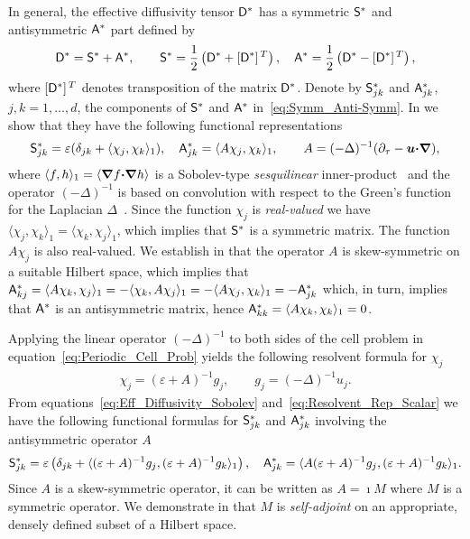 \documentclass[amsa]{ipart}
\begin{document}
In general, the effective diffusivity tensor $\mathsf{D}^*$ has a symmetric
$\mathsf{S}^*$ and antisymmetric $\mathsf{A}^*$ part defined by 
%
\begin{align}\label{eq:Symm_Anti-Symm}
  \Dm^*=\Sm^*+\Am^*,\qquad
  \Sm^*=\frac{1}{2}\left(\Dm^*+[\Dm^*]^{\,T}\right), \quad
  \Am^*=\frac{1}{2}\left(\Dm^*-[\Dm^*]^{\,T}\right),
\end{align}
%
where $[\mathsf{D}^*]^{\,T}$ denotes transposition of the matrix
$\mathsf{D}^*$. Denote by $\mathsf{S}^*_{jk}$ and $\mathsf{A}^*_{jk}$, $j,k=1,\ldots,d$, the
components of $\mathsf{S}^*$ and $\mathsf{A}^*$ in~\eqref{eq:Symm_Anti-Symm}. In
 we show that they have the following
functional representations~\cite{Pavliotis:PHD_Thesis} 
%
\begin{align}\label{eq:Eff_Diffusivity_Sobolev}
  \Sm^*_{jk}=\varepsilon(\delta_{jk}+\langle\chi_j,\chi_k\rangle_1),
  \quad
  \Am^*_{jk}=\langle A\chi_j,\chi_k\rangle_1,
  \qquad
  A=(-\Delta)^{-1}(\partial_\tau-\vecu \bcdot\bnabla),
\end{align}
%
where $\langle f,h\rangle_1=\langle\mbox{\boldmath${\nabla}$} f\mbox{\boldmath${\cdot}$}\mbox{\boldmath${\nabla}$} h\rangle$ is a Sobolev-type
\emph{sesquilinear} inner-product~\cite{McOwen:2003:PDE} and the
operator $(-\Delta)^{-1}$ is based on convolution with respect to the
Green's function for the Laplacian $\Delta$~\cite{Stakgold:BVP:2000}.  
Since the function $\chi_j$ is
\emph{real-valued} we have $\langle\chi_j,\chi_k\rangle_1=\langle\chi_k,\chi_j\rangle_1$, which implies that
$\mathsf{S}^*$ is a symmetric matrix. The function $A\chi_j$ is also
real-valued. We establish in  that the
operator $A$ is skew-symmetric on a suitable Hilbert space, which
implies that
$\mathsf{A}^*_{kj}=\langle A\chi_k,\chi_j\rangle_1=-\langle\chi_k,A\chi_j\rangle_1=-\langle A\chi_j,\chi_k\rangle_1=-\mathsf{A}^*_{jk}$
which, in turn, implies that $\mathsf{A}^*$ is an antisymmetric matrix, hence
$\mathsf{A}^*_{kk}=\langle A\chi_k,\chi_k\rangle_1=0$.  



Applying the linear operator $(-\Delta)^{-1}$ to both sides of the cell
problem in equation~\eqref{eq:Periodic_Cell_Prob} yields the following
resolvent formula for $\chi_j$
%
\begin{align}\label{eq:Resolvent_Rep_Scalar}
  \chi_j=(\varepsilon+A)^{-1}g_j, \qquad 
  g_j=(-\Delta)^{-1}u_j.
\end{align}
%
From equations~\eqref{eq:Eff_Diffusivity_Sobolev}
and~\eqref{eq:Resolvent_Rep_Scalar} we have the following functional
formulas for $\mathsf{S}^*_{jk}$ and $\mathsf{A}^*_{jk}$ involving the
antisymmetric operator $A$
%
\begin{align}\label{eq:Eff_Diff_Resolvent_Sobolev}
 \Sm^*_{jk}=\varepsilon\left(\delta_{jk}
  +\langle(\varepsilon+A)^{-1}g_j,(\varepsilon+A)^{-1}g_k\rangle_1\right), 
  \quad
 \Am^*_{jk}=\langle A(\varepsilon+A)^{-1}g_j,(\varepsilon+A)^{-1}g_k\rangle_1.
\end{align}
%
Since $A$ is a skew-symmetric operator, it can be written as $A=\imath M$
where $M$ is a symmetric operator. We demonstrate in
 that $M$ is \emph{self-adjoint} on an
appropriate, densely defined subset of a Hilbert space.
\end{document}
